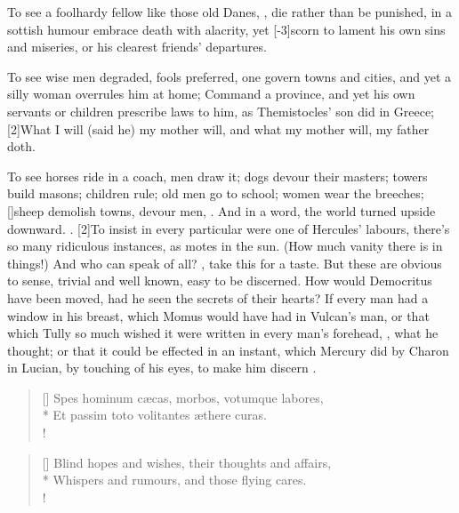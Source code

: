 {To see a foolhardy fellow like those old Danes, , die rather than be punished, in a sottish humour
embrace death with alacrity, yet [-3\baselineskip]scorn to lament his own sins and
miseries, or his clearest friends' departures.

To see wise men degraded, fools preferred, one govern towns and cities,
and yet a silly woman overrules him at home; Command a province,
and yet his own servants or children prescribe laws to him, as
Themistocles' son did in Greece; [2\baselineskip]What I will (said he) my mother
will, and what my mother will, my father doth.

To see horses ride in a coach, men draw it; dogs devour their masters; towers build masons;
children rule; old men go to school; women wear the breeches;
[\baselineskip]sheep demolish towns, devour men, \etc{}. And in a word, the world
turned upside downward. .
[2\baselineskip]To insist in every particular were one of Hercules' labours,
there's so many ridiculous instances, as motes in the sun.  (How much vanity there is in things!) And who can speak
of all? , take this for a taste.
But these are obvious to sense, trivial and well known, easy to be
discerned. How would Democritus have been moved, had he seen the
secrets of their hearts? If every man had a window in his breast, which
Momus would have had in Vulcan's man, or that which Tully so much
wished it were written in every man's forehead, , what he thought; or that it could be effected in an
instant, which Mercury did by Charon in Lucian, by touching of his
eyes, to make him discern .

\begin{verse}[\versewidth]
\textlatin{Spes hominum c\ae{}cas, morbos, votumque labores,}\\*
\textlatin{Et passim toto volitantes \ae{}there curas.}\\!
\end{verse}

\settowidth{\versewidth}{Blind hopes and wishes, their thoughts and affairs,}
\begin{verse}[\versewidth]
Blind hopes and wishes, their thoughts and affairs,\\*
Whispers and rumours, and those flying cares.\\!
\end{verse}

}

